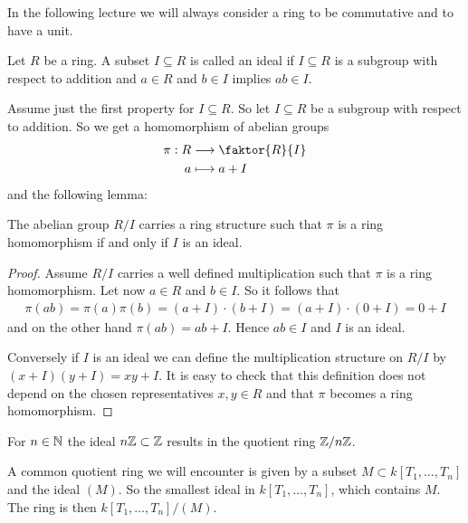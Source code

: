 \documentclass[../notes.tex]{subfiles}
\begin{document}
In the following lecture we will always consider a ring to be commutative and to have a unit.

\smallskip
\begin{defi}{}{}
  Let $R$ be a ring. A subset $I \subseteq R$ is called an ideal if $I \subseteq R$ is a subgroup
  with respect to addition and $a \in R$ and $b \in I$ implies $ab \in I$.
\end{defi}

\smallskip
\noindent
Assume just the first property for $I \subseteq R$. So let $I \subseteq R$ be a subgroup
with respect to addition. So we get a homomorphism of abelian groups
\begin{align*}
  \pi : R & \longrightarrow \faktor{R}{I} \\
  a & \longmapsto a + I
\end{align*}
and the following lemma:

\smallskip
\begin{lemm}{}{}
  The abelian group $R / I$ carries a ring structure such that $\pi$ is a ring homomorphism
  if and only if $I$ is an ideal.
\end{lemm}

\begin{proof}
  Assume $R / I$ carries a well defined multiplication such that $\pi$ is a ring homomorphism.
  Let now $a \in R$ and $b \in I$. So it follows that
  \begin{align*}
    \pi(ab) = \pi(a) \pi(b) =(a + I) \cdot (b + I) = (a + I) \cdot (0 + I) = 0 + I
  \end{align*}
  and on the other hand $\pi(ab) = ab + I$. Hence $ab \in I$ and $I$ is an ideal.

  \noindent
  Conversely if $I$ is an ideal we can define the multiplication structure on $R/I$
  by $(x + I)(y + I) = xy + I$. It is easy to check that this definition does not depend
  on the chosen representatives $x,y \in R$ and that $\pi$ becomes a ring homomorphism.
  
\end{proof}

\smallskip
\begin{ex}{}{}
  For $n \in {\mathbb{N}}$ the ideal $n {\mathbb{Z}} \subset {\mathbb{Z}}$ results in the quotient ring ${\mathbb{Z}} / n {\mathbb{Z}}$.

  \smallskip
  \noindent
  A common quotient ring we will encounter is given by a subset $M \subset k[T_1, \dots, T_n]$
  and the ideal $(M)$. So the smallest ideal in $k[T_1, \dots, T_n]$, which contains $M$.
  The ring is then $k[T_1, \dots, T_n] / (M)$.
\end{ex}
\end{document}
